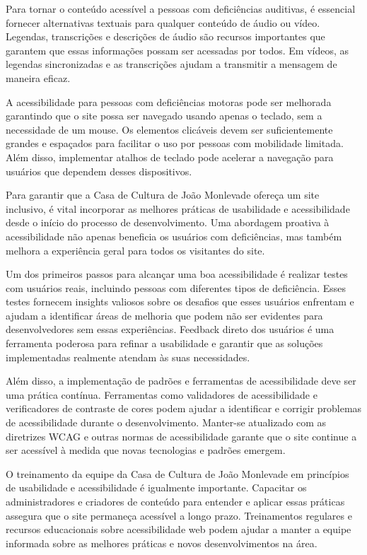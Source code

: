 Para tornar o conteúdo acessível a pessoas com deficiências auditivas, é essencial fornecer alternativas textuais para qualquer conteúdo de áudio ou vídeo. Legendas, transcrições e descrições de áudio são recursos importantes que garantem que essas informações possam ser acessadas por todos. Em vídeos, as legendas sincronizadas e as transcrições ajudam a transmitir a mensagem de maneira eficaz.

A acessibilidade para pessoas com deficiências motoras pode ser melhorada garantindo que o site possa ser navegado usando apenas o teclado, sem a necessidade de um mouse. Os elementos clicáveis devem ser suficientemente grandes e espaçados para facilitar o uso por pessoas com mobilidade limitada. Além disso, implementar atalhos de teclado pode acelerar a navegação para usuários que dependem desses dispositivos.

Para garantir que a Casa de Cultura de João Monlevade ofereça um site inclusivo, é vital incorporar as melhores práticas de usabilidade e acessibilidade desde o início do processo de desenvolvimento. Uma abordagem proativa à acessibilidade não apenas beneficia os usuários com deficiências, mas também melhora a experiência geral para todos os visitantes do site.

Um dos primeiros passos para alcançar uma boa acessibilidade é realizar testes com usuários reais, incluindo pessoas com diferentes tipos de deficiência. Esses testes fornecem insights valiosos sobre os desafios que esses usuários enfrentam e ajudam a identificar áreas de melhoria que podem não ser evidentes para desenvolvedores sem essas experiências. Feedback direto dos usuários é uma ferramenta poderosa para refinar a usabilidade e garantir que as soluções implementadas realmente atendam às suas necessidades.

Além disso, a implementação de padrões e ferramentas de acessibilidade deve ser uma prática contínua. Ferramentas como validadores de acessibilidade e verificadores de contraste de cores podem ajudar a identificar e corrigir problemas de acessibilidade durante o desenvolvimento. Manter-se atualizado com as diretrizes WCAG e outras normas de acessibilidade garante que o site continue a ser acessível à medida que novas tecnologias e padrões emergem.

O treinamento da equipe da Casa de Cultura de João Monlevade em princípios de usabilidade e acessibilidade é igualmente importante. Capacitar os administradores e criadores de conteúdo para entender e aplicar essas práticas assegura que o site permaneça acessível a longo prazo. Treinamentos regulares e recursos educacionais sobre acessibilidade web podem ajudar a manter a equipe informada sobre as melhores práticas e novos desenvolvimentos na área.

